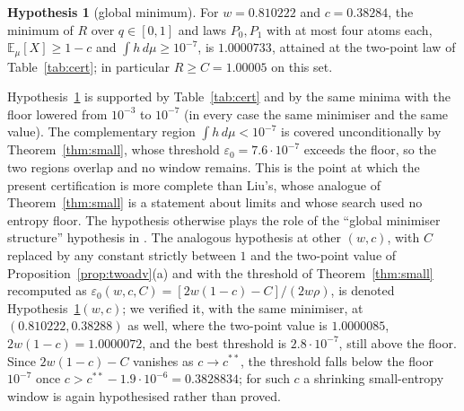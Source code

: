 \documentclass[11pt,a4paper]{article}
\theoremstyle{definition}
\newtheorem{hypothesis}[theorem]{Hypothesis}
\theoremstyle{remark}
\newcommand{\E}{\mathbb{E}}
\newcommand{\ent}{h}
\begin{document}
\begin{hypothesis}[global minimum]\label{hyp:global}
For $w=0.810222$ and $c=0.38284$, the minimum of $R$ over $q\in[0,1]$ and laws $P_0,P_1$ with at most four atoms each, $\E_\mu[X]\ge1-c$ and $\int\ent\,d\mu\ge10^{-7}$, is $1.0000733$, attained at the two-point law of Table~\ref{tab:cert}; in particular $R\ge C=1.00005$ on this set.
\end{hypothesis}
Hypothesis~\ref{hyp:global} is supported by Table~\ref{tab:cert} and by the same minima with the floor lowered from $10^{-3}$ to $10^{-7}$ (in every case the same minimiser and the same value). The complementary region $\int\ent\,d\mu<10^{-7}$ is covered unconditionally by Theorem~\ref{thm:small}, whose threshold $\varepsilon_0=7.6\cdot10^{-7}$ exceeds the floor, so the two regions overlap and no window remains. This is the point at which the present certification is more complete than Liu's, whose analogue of Theorem~\ref{thm:small} \cite[Lemma~7]{Liu} is a statement about limits and whose search used no entropy floor. The hypothesis otherwise plays the role of the ``global minimiser structure'' hypothesis in \cite[Theorem~13]{Liu}. The analogous hypothesis at other $(w,c)$, with $C$ replaced by any constant strictly between $1$ and the two-point value of Proposition~\ref{prop:twoadv}(a) and with the threshold of Theorem~\ref{thm:small} recomputed as $\varepsilon_0(w,c,C)=[2w(1-c)-C]/(2w\rho)$, is denoted Hypothesis~\ref{hyp:global}$(w,c)$; we verified it, with the same minimiser, at $(0.810222,0.38288)$ as well, where the two-point value is $1.0000085$, $2w(1-c)=1.0000072$, and the best threshold is $2.8\cdot10^{-7}$, still above the floor. Since $2w(1-c)-C$ vanishes as $c\to c^{**}$, the threshold falls below the floor $10^{-7}$ once $c>c^{**}-1.9\cdot10^{-6}=0.3828834$; for such $c$ a shrinking small-entropy window is again hypothesised rather than proved.
\end{document}
